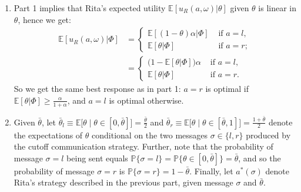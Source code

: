 \documentclass[a4paper]{article}
\begin{document}
\begin{enumerate}
	\item Part 1 implies that Rita's expected utility $\mathbb{E}[u_R(a,\omega)|\theta]$ given $\theta$ is linear in $\theta$, hence we get:
	\begin{align*}
		\mathbb{E}[u_R(a,\omega)|\Phi] &= \begin{cases}
			\mathbb{E}[ (1-\theta)\alpha |\Phi] & \text{ if } a=l, \\
			\mathbb{E}[ \theta |\Phi] & \text{ if } a=r;
		\end{cases}
		\\
		&= \begin{cases}
			\Big(1- \mathbb{E}[\theta|\Phi] \Big) \alpha & \text{ if } a=l, \\
			\mathbb{E}[\theta|\Phi] & \text{ if } a=r.
		\end{cases}
	\end{align*}
	So we get the same best response as in part 1: $a=r$ is optimal if $\mathbb{E}[\theta|\Phi] \geq \frac{\alpha}{1+\alpha}$, and $a=l$ is optimal otherwise. 
	
	\item Given $\bar{\theta}$, let $\bar{\theta}_l \equiv \mathbb{E} \Big[ \theta \mid \theta \in [0,\bar{\theta}] \Big] = \frac{\bar{\theta}}{2}$ and $\bar{\theta}_r \equiv \mathbb{E} \Big[ \theta \mid \theta \in [\bar{\theta},1] \Big] = \frac{1+\bar{\theta}}{2}$ denote the expectations of $\theta$ conditional on the two messages $\sigma \in \{l,r\}$ produced by the cutoff communication strategy. Further, note that the probability of message $\sigma=l$ being sent equals $\mathbb{P}\{\sigma=l\} = \mathbb{P}\{ \theta \in [0,\bar{\theta}] \} = \bar{\theta}$, and so the probability of message $\sigma=r$ is $\mathbb{P}\{\sigma=r\} = 1-\bar{\theta}$. Finally, let $a^*(\sigma)$ denote Rita's strategy described in the previous part, given message $\sigma$ and $\bar{\theta}$.
	

\end{enumerate}
\end{document}
